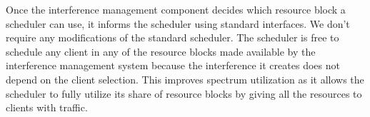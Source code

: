 Once the interference management component decides which resource block a scheduler can use, it informs the scheduler using standard interfaces. We don't require any modifications of the standard scheduler. The scheduler is free to schedule any client in any of the resource blocks made available by the interference management system because the interference it creates does not depend on the client selection. This improves spectrum utilization as it allows the scheduler to fully utilize its share of resource blocks by giving all the resources to clients with traffic. 
















